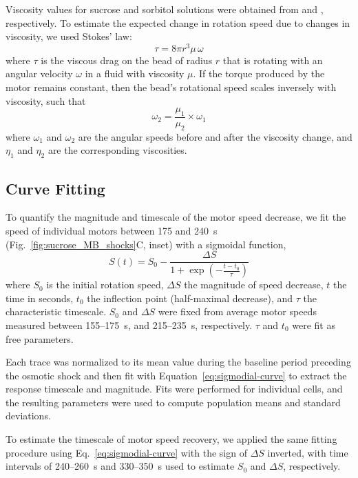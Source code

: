 \documentclass[twocolumn]{biophys-new}%
\begin{document}
Viscosity values for sucrose and sorbitol solutions were obtained from \cite{swindells1958} and \cite{Sahare2021}, respectively. To estimate the expected change in rotation speed due to changes in viscosity, we used Stokes' law:
\begin{equation}
    \tau = 8 \pi r^3 \mu \, \omega
    \label{eq:stoke-law}
\end{equation}
where $\tau$ is the viscous drag on the bead of radius $r$ that is rotating with an angular velocity $\omega$ in a fluid with viscosity $\mu$. If the torque produced by the motor remains constant, then the bead’s rotational speed scales inversely with viscosity, such that 
\begin{equation}
   \omega_2 = \frac{\mu_1}{\mu_2} \times \omega_1
    \label{eq:stoke-law-simple}
\end{equation}
where $\omega_{1}$ and $\omega_{2}$ are the angular speeds before and after the viscosity change, and $\eta_{1}$ and $\eta_{2}$ are the corresponding viscosities.

\subsection*{\textbf{Curve Fitting}}
To quantify the magnitude and timescale of the motor speed decrease, we fit the speed of individual motors between 175 and 240~s (Fig.~\ref{fig:sucrose_MB_shocks}C, inset) with a sigmoidal function,
\begin{equation}
    S(t) = S_0 - \frac{\Delta S}{1 + \exp\left(-\frac{t - t_0}{\tau}\right)}
    \label{eq:sigmodial-curve}
\end{equation}
where $S_0$ is the initial rotation speed, $\Delta S$ the magnitude of speed decrease, $t$ the time in seconds, $t_0$ the inflection point (half-maximal decrease), and $\tau$ the characteristic timescale. $S_0$ and $\Delta S$ were fixed from average motor speeds measured between 155--175~s, and 215--235~s, respectively. $\tau$ and $t_0$ were fit as free parameters.

Each trace was normalized to its mean value during the baseline period preceding the osmotic shock and then fit with Equation~\ref{eq:sigmodial-curve} to extract the response timescale and magnitude. Fits were performed for individual cells, and the resulting parameters were used to compute population means and standard deviations.

To estimate the timescale of motor speed recovery, we applied the same fitting procedure using Eq.~\ref{eq:sigmodial-curve} with the sign of $\Delta S$ inverted, with time intervals of 240--260~s and 330--350~s used to estimate $S_0$ and $\Delta S$, respectively.
\end{document}
